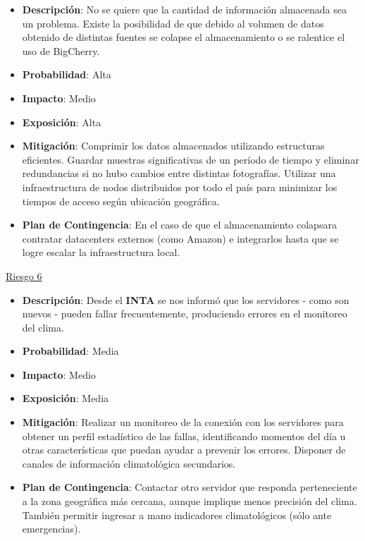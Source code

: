 \begin{itemize} \itemsep -2pt
    \item \textbf{Descripción}: No se quiere que la cantidad de información almacenada sea un problema. Existe la posibilidad de que debido al volumen de datos obtenido de distintas fuentes se colapse el almacenamiento o se ralentice el uso de BigCherry.
    \item \textbf{Probabilidad}: Alta
    \item \textbf{Impacto}: Medio	
    \item \textbf{Exposición}: Alta
    \item \textbf{Mitigación}: Comprimir los datos almacenados utilizando estructuras eficientes. Guardar muestras significativas de un período de tiempo y eliminar redundancias si no hubo cambios entre distintas fotografías. Utilizar una infraestructura de nodos distribuidos por todo el país para minimizar los tiempos de acceso según ubicación geográfica.
    \item \textbf{Plan de Contingencia}: En el caso de que el almacenamiento colapsara contratar datacenters externos (como Amazon) e integrarlos hasta que se logre escalar la infraestructura local.
\end{itemize}

\underline{Riesgo 6}

\begin{itemize} \itemsep -2pt
    \item \textbf{Descripción}: Desde el \textbf{INTA} se nos informó que los servidores - como son nuevos - pueden fallar frecuentemente, produciendo errores en el monitoreo del clima.
    \item \textbf{Probabilidad}: Media
    \item \textbf{Impacto}: Medio
    \item \textbf{Exposición}: Media
    \item \textbf{Mitigación}: Realizar un monitoreo de la conexión con los servidores para obtener un perfil estadístico de las fallas, identificando momentos del día u otras características que puedan ayudar a prevenir los errores. Disponer de canales de información climatológica secundarios.
    \item \textbf{Plan de Contingencia}: Contactar otro servidor que responda perteneciente a la zona geográfica más cercana, aunque implique menos precisión del clima. También permitir ingresar a mano indicadores climatológicos (sólo ante emergencias).
\end{itemize}
 
